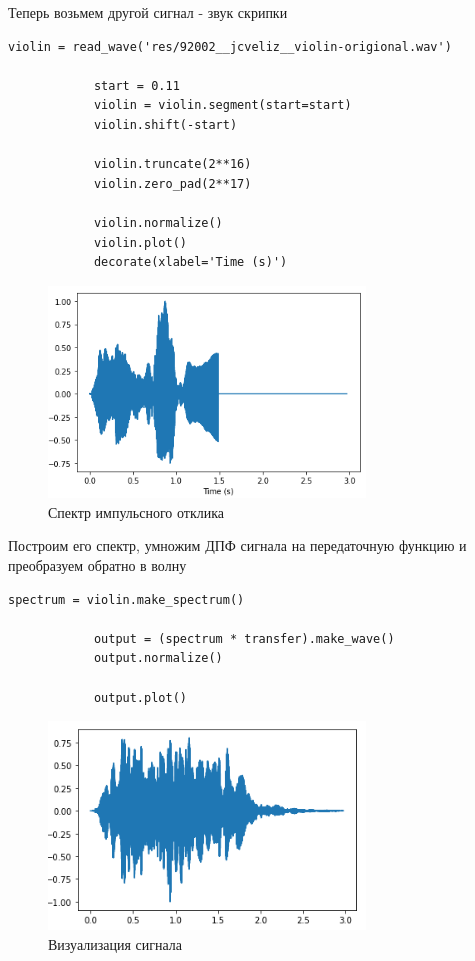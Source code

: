 \documentclass[a4paper,12pt]{article}
\begin{document}
\begin{enumerate}
		Теперь возьмем другой сигнал - звук скрипки
		\begin{lstlisting}[caption=Звук скрипки]
			violin = read_wave('res/92002__jcveliz__violin-origional.wav')
			
			start = 0.11
			violin = violin.segment(start=start)
			violin.shift(-start)
			
			violin.truncate(2**16)
			violin.zero_pad(2**17)
			
			violin.normalize()
			violin.plot()
			decorate(xlabel='Time (s)')
		\end{lstlisting}
		\begin{figure}[H]
			\centering
			\includegraphics[width=0.75\textwidth]{1_3.png}
			\caption{Спектр импульсного отклика}
			\label{fig:1.3}
		\end{figure}
		
		Построим его спектр, умножим ДПФ сигнала на передаточную функцию и преобразуем обратно в волну
		\begin{lstlisting}[caption=Визуализация сигнала]
			spectrum = violin.make_spectrum()
			
			output = (spectrum * transfer).make_wave()
			output.normalize()
			
			output.plot()
		\end{lstlisting}
		\begin{figure}[H]
			\centering
			\includegraphics[width=0.75\textwidth]{1_4.png}
			\caption{Визуализация сигнала}
			\label{fig:1.4}
		\end{figure}
		

\end{enumerate}
\end{document}
